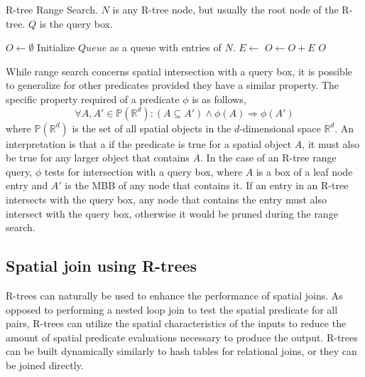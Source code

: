 \begin{algorithm}
  \caption{R-tree Range Search. \(N\) is any R-tree node, but usually the root node of the R-tree. \(Q\) is the query box.}
  \label{alg/r-tree-range-search}
  \begin{algorithmic}[1]
      \State \(O \leftarrow \emptyset\)
      \State Initialize \(Queue\) as a queue with entries of \(N\).
        \State \(E \leftarrow\) 
            \State \(O \leftarrow O + E\)
          \Else
              \State {}
            \EndFor
          \EndIf
        \EndIf
      \EndWhile
      \State \Return \(O\)
    \EndFunction
  \end{algorithmic}
\end{algorithm}

While range search concerns spatial intersection with a query box, it is possible to generalize for other predicates provided they have a similar property. The specific property required of a predicate \(\phi\) is as follows,
\[
  \forall A, A' \in \mathbb{P}(\mathbb{R}^d) : (A \subseteq A') \wedge \phi(A) \Rightarrow \phi(A')
\]
where \(\mathbb{P}(\mathbb{R}^d)\) is the set of all spatial objects in the \(d\)-dimensional space \(\mathbb{R}^d\). An interpretation is that a if the predicate is true for a spatial object \(A\), it must also be true for any larger object that contains \(A\). In the case of an R-tree range query, \(\phi\) tests for intersection with a query box, where \(A\) is a box of a leaf node entry and \(A'\) is the MBB of any node that contains it. If an entry in an R-tree intersects with the query box, any node that contains the entry must also intersect with the query box, otherwise it would be pruned during the range search.

\subsection{Spatial join using R-trees}

R-trees can naturally be used to enhance the performance of spatial joins. As opposed to performing a nested loop join to test the spatial predicate for all pairs, R-trees can utilize the spatial characteristics of the inputs to reduce the amount of spatial predicate evaluations necessary to produce the output. R-trees can be built dynamically similarly to hash tables for relational joins, or they can be joined directly.

